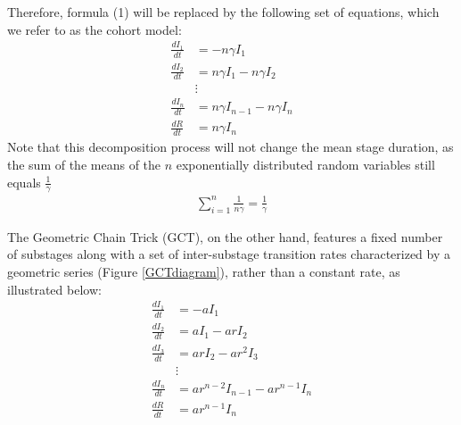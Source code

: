 \documentclass[12pt]{article}
\begin{document}
Therefore, formula (1) will be replaced by the following set of equations, which we refer to as the cohort model:
\begin{align}
    \frac{dI_1}{dt} &= - n \gamma I_1 \\
    \frac{dI_2}{dt} &= n\gamma I_1 - n \gamma I_2 \\
    &\vdots \\
    \frac{dI_n}{dt} &= n\gamma I_{n-1} - n \gamma I_n \\
    \frac{dR}{dt} &= n \gamma I_n
\end{align}
Note that this decomposition process will not change the mean stage duration, as the sum of the means of the $n$ exponentially distributed random variables still equals $\frac{1}{\gamma}$
\begin{align*}
    \sum_{i=1}^{n} \frac{1}{n\gamma} = \frac{1}{\gamma}
\end{align*}

The Geometric Chain Trick (GCT), on the other hand, features a fixed number of substages along with a set of inter-substage transition rates characterized by a geometric series (Figure \ref{GCTdiagram}), rather than a constant rate, as illustrated below:
\begin{align}
    \frac{dI_1}{dt} &= - a I_1 \\
    \frac{dI_2}{dt} &= a I_1 - ar I_2 \\
    \frac{dI_3}{dt} &= ar I_2 - ar^2 I_3 \\
    &\vdots \\
    \frac{dI_n}{dt} &= ar^{n-2} I_{n-1} - ar^{n-1} I_n \\
    \frac{dR}{dt} &= ar^{n-1} I_n
\end{align}
\end{document}
